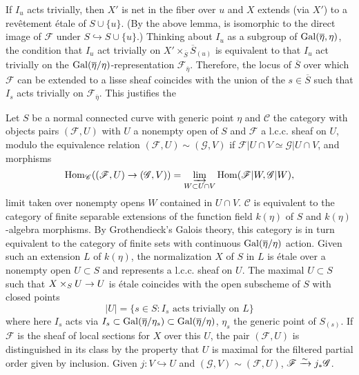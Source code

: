 \documentclass[deligne.tex]{subfiles}
\begin{document}
	If $I_u$ acts trivially, then $X'$ is net in the fiber over $u$ and $X$ 
	extends (via $X'$) to a revêtement étale of
	$S\cup\{u\}$. (By the above lemma, is isomorphic to the direct image
	of $\mathscr F$ under $S\hookrightarrow S\cup\{u\}$.)
	Thinking about $I_u$ as a subgroup of $\operatorname{Gal}(\overline\eta,\eta)$,
	the condition that $I_u$ act trivially on
	$X'\times_{\overline S}\overline S_{(u)}$ is equivalent to that $I_u$
	act trivially on the
	$\operatorname{Gal}(\overline\eta/\eta)$-representation $\mathscr F_{\overline\eta}$.
	Therefore, the locus of $\overline S$ over which $\mathscr F$ can be
	extended to a lisse sheaf coincides with the union of the
	$s\in\overline S$ such that $I_s$ acts trivially on
	$\mathscr F_{\overline\eta}$. This justifies the
\begin{proposition*}
	Let $S$ be a normal connected curve with generic point $\eta$ 
	and $\mathscr C$ the category with objects pairs $(\mathscr F,U)$ with 
	$U$ a nonempty open of $S$ and $\mathscr F$ a l.c.c. sheaf on $U$,
	modulo the equivalence relation $(\mathscr F,U)\sim(\mathscr G,V)$ if
	$\mathscr F|U\cap V\simeq\mathscr G|U\cap V$, and morphisms
	\begin{equation*}
		\operatorname{Hom}_{\mathscr C}((\mathscr F,U)\rightarrow(\mathscr G,V))
		=\varinjlim_{W\subset U\cap V}\operatorname{Hom}(\mathscr F|W,\mathscr G|W),
	\end{equation*}
	limit taken over nonempty opens $W$ contained in $U\cap V$.
	$\mathscr C$ is equivalent to the category of finite separable extensions
	of the function field $k(\eta)$ of $S$ and $k(\eta)$-algebra morphisms.
	By Grothendieck's Galois theory, this category is in turn equivalent to
	the category of finite sets with continuous $\operatorname{Gal}(\overline\eta/\eta)$
	action.
	Given such an extension $L$ of $k(\eta)$, the normalization $X$ of $S$ in
	$L$ is étale over a nonempty open $U\subset S$ and represents a l.c.c.
	sheaf on $U$. The maximal $U\subset S$ such that $X\times_SU\rightarrow U$ 
	is étale coincides with the open subscheme of $S$ with closed points
	\begin{equation*}
		|U|=\{s\in S:I_s\text{ acts trivially on }L\}
	\end{equation*}
	where here $I_s$ acts via
	$I_s\subset\operatorname{Gal}(\overline\eta/\eta_s)\subset\operatorname{Gal}(\overline\eta/\eta)$,
	$\eta_s$ the generic point of $S_{(s)}$.
	If $\mathscr F$ is the sheaf of local sections for $X$ over this $U$,
	the pair $(\mathscr F,U)$ is distinguished in its class by
	the property that $U$ is maximal for the filtered partial order given
	by inclusion. Given $j:V\hookrightarrow U$ and
	$(\mathscr G,V)\sim(\mathscr F,U)$, $\mathscr F\xrightarrow\sim j_*\mathscr G$.
\end{proposition*}
\end{document}
